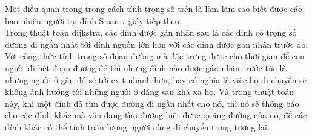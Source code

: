     Một điều quan trọng trong cách tính trọng số trên là làm làm sao biết được cáo bao 
    nhiêu người tại đỉnh S sau $\tau$ giây tiếp theo.  \\ 
    Trong thuật toán dijkstra, các đỉnh được gán nhãn sau là các đỉnh có trọng số đường đi 
    ngắn nhất tới đỉnh nguồn lớn hơn với các đỉnh được gán nhãn trước đó. Với công thức 
    tính trọng số đoạn đường mà đặc trưng được cho thời gian để con người đi hết đoạn đường
    đó thì những đỉnh nào được gán nhãn trước tức là những người ở gần đó sẽ tới exit 
    nhanh hơn, hay có nghĩa là việc họ di chuyển sẽ không ảnh hưởng tới những người 
    ở dằng sau khá xa họ. Và trong thuật toán này, khi một đỉnh đã tìm được đường đi 
    ngắn nhất cho nó, thì nó sẽ thông báo cho các đỉnh khác mà vẫn đang tìm đường biết
    được quãng đường của nó, để các đỉnh khác có thể tính toán lượng người cùng di chuyển 
    trong tương lai.

